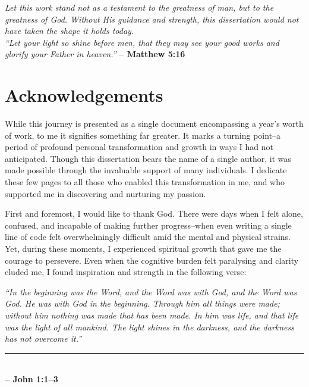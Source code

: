 \pagebreak
\clearpage
\vspace*{\fill}

{
\large
\hspace{3.5cm} \hfill \textit{Let this work stand not as a testament to the greatness of man, but to the greatness of God. Without His guidance and strength, this dissertation would not have taken the shape it holds today.\\[1em]
\noindent ``Let your light so shine before men, that they may see your good works and glorify your Father in heaven.''}
\textbf{-- Matthew 5:16}
}

\vspace*{\fill}

\clearpage

\chapter*{Acknowledgements}

\noindent While this journey is presented as a single document encompassing a year’s worth of work, to me it signifies something far greater. It marks a turning point--a period of profound personal transformation and growth in ways I had not anticipated. Though this dissertation bears the name of a single author, it was made possible through the invaluable support of many individuals. I dedicate these few pages to all those who enabled this transformation in me, and who supported me in discovering and nurturing my passion.

\bigskip

\noindent First and foremost, I would like to thank God. There were days when I felt alone, confused, and incapable of making further progress--when even writing a single line of code felt overwhelmingly difficult amid the mental and physical strains. Yet, during these moments, I experienced spiritual growth that gave me the courage to persevere. Even when the cognitive burden felt paralysing and clarity eluded me, I found inspiration and strength in the following verse:

\bigskip\bigskip

\noindent
\textit{``In the beginning was the Word, and the Word was with God, and the Word was God. He was with God in the beginning. Through him all things were made; without him nothing was made that has been made. In him was life, and that life was the light of all mankind. The light shines in the darkness, and the darkness has not overcome it.''} \\[1ex]
\noindent\rule{\textwidth}{1pt} \\[1ex]
\hfill \textbf{-- John 1:1–3}


